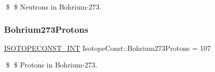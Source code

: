 \$ \$ Neutrons in Bohrium-\/273. \mbox{\label{group___isotope_const-_bohrium-_bh273_ga033897448d7788e7ce5f4bf2117a0f76}} 
\subsubsection{\texorpdfstring{Bohrium273\+Protons}{Bohrium273Protons}}
{\footnotesize\ttfamily \mbox{\hyperlink{group___isotope_const-_macros_ga5f18360b3e99483a35c32d789e62621c}{I\+S\+O\+T\+O\+P\+E\+C\+O\+N\+S\+T\+\_\+\+I\+NT}} Isotope\+Const\+::\+Bohrium273\+Protons = 107}

\$ \$ Protons in Bohrium-\/273. 